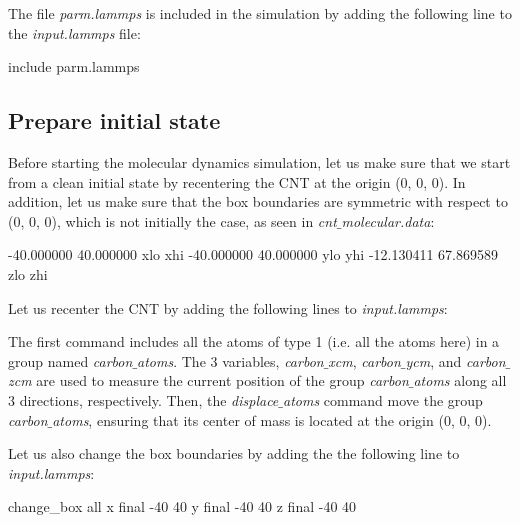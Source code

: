 \vspace{0.25cm} \noindent The file \textit{parm.lammps} is included in the
simulation by adding the following line to the \textit{input.lammps} file:

\begin{lcverbatim}
include parm.lammps
\end{lcverbatim}

\subsection{Prepare initial state}
Before starting the molecular dynamics simulation,
let us make sure that we start from a clean initial state
by recentering the CNT at the origin (0, 0, 0). In addition, 
let us make sure that the box boundaries 
are symmetric with respect to (0, 0, 0), which is not initially the case,
as seen in \textit{cnt$\_$molecular.data}:

\begin{lcverbatim}
-40.000000 40.000000  xlo xhi
-40.000000 40.000000  ylo yhi
-12.130411 67.869589  zlo zhi
\end{lcverbatim}

\noindent Let us recenter the CNT by adding the following lines
to \textit{input.lammps}:


\noindent The first command includes all the atoms of type 1
(i.e. all the atoms here) in a group named \textit{carbon$\_$atoms}. 
The 3 variables, \textit{carbon$\_$xcm}, \textit{carbon$\_$ycm}, and \textit{carbon$\_$zcm} 
are used to measure
the current position of the group \textit{carbon$\_$atoms}
along all 3 directions, respectively. Then, the \textit{displace$\_$atoms} 
command move the group \textit{carbon$\_$atoms}, ensuring that its center of mass 
is located at the origin (0, 0, 0).

\vspace{0.25cm} \noindent Let us also change the box boundaries by adding the 
the following line to \textit{input.lammps}:

\begin{lcverbatim}
change_box all x final -40 40 y final -40 40 z final -40 40
\end{lcverbatim}

